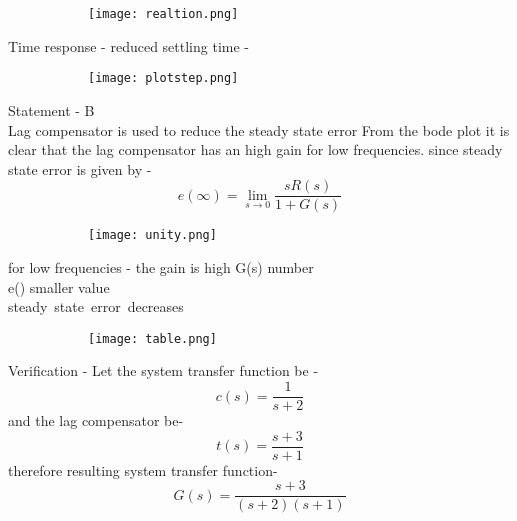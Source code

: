 \begin{enumerate}[label=\thesubsection.\arabic*.,ref=\thesubsection.\theenumi]
\begin{figure}[h]
 
\begin{subfigure}{\textwidth}
\texttt{[image: realtion.png]} 
\label{fig:subim1}
\end{subfigure}
\end{figure}

    



Time response - reduced settling time - 
\begin{figure}[h]
 
\begin{subfigure}{\textwidth}
\texttt{[image: plotstep.png]} 
\label{fig:subim1}
\end{subfigure}
\end{figure}

    
Statement - B\\Lag compensator is used to reduce the steady state error
From the bode plot it is clear that the lag compensator has an high gain for low frequencies.
since steady state error is given by - 
\begin{equation}
    e(\infty) = \lim_{s\to0} \frac{sR(s)}{1+G(s)}
\end{equation}
\begin{figure}[h]
 
\begin{subfigure}{\textwidth}
\texttt{[image: unity.png]} 
\label{fig:subim1}
\end{subfigure}
\end{figure}



for low frequencies - the gain is high \implies G(s) \to \large number\\
\implies e(\infty) \to smaller value\\
\implies steady\ state\ error\ decreases \\
\begin{figure}[h]
 
\begin{subfigure}{\textwidth}
\texttt{[image: table.png]} 
\label{fig:subim1}
\end{subfigure}
\end{figure}


Verification - 
Let the system transfer function be -
\begin{equation}
   c(s)= \frac{1}{s+2}
\end{equation}
and the lag compensator be- 
\begin{equation}
   t(s)= \frac{s+3}{s+1}
\end{equation}
therefore resulting system transfer function-
\begin{equation}
    G(s) = \frac{s+3}{(s+2)(s+1)}
\end{equation}


\end{enumerate}
